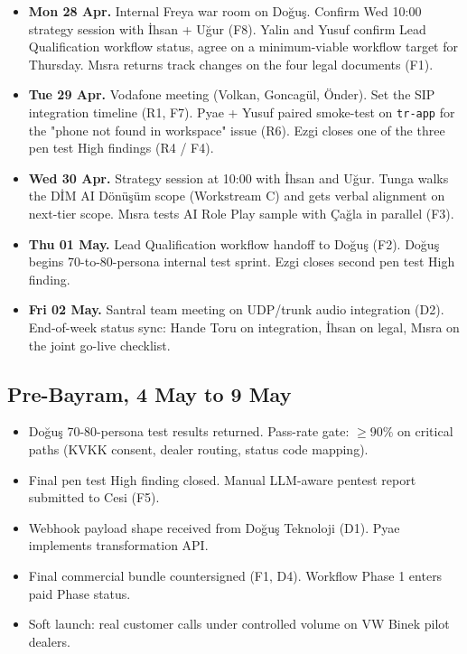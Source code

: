 \documentclass[10pt,a4paper]{article}
\begin{document}
\begin{itemize}[leftmargin=1em,itemsep=0.2em]
\item \textbf{Mon 28 Apr.} Internal Freya war room on Doğuş. Confirm Wed 10:00 strategy session with İhsan + Uğur (F8). Yalin and Yusuf confirm Lead Qualification workflow status, agree on a minimum-viable workflow target for Thursday. Mısra returns track changes on the four legal documents (F1).
\item \textbf{Tue 29 Apr.} Vodafone meeting (Volkan, Goncagül, Önder). Set the SIP integration timeline (R1, F7). Pyae + Yusuf paired smoke-test on \texttt{tr-app} for the "phone not found in workspace" issue (R6). Ezgi closes one of the three pen test High findings (R4 / F4).
\item \textbf{Wed 30 Apr.} Strategy session at 10:00 with İhsan and Uğur. Tunga walks the DİM AI Dönüşüm scope (Workstream C) and gets verbal alignment on next-tier scope. Mısra tests AI Role Play sample with Çağla in parallel (F3).
\item \textbf{Thu 01 May.} Lead Qualification workflow handoff to Doğuş (F2). Doğuş begins 70-to-80-persona internal test sprint. Ezgi closes second pen test High finding.
\item \textbf{Fri 02 May.} Santral team meeting on UDP/trunk audio integration (D2). End-of-week status sync: Hande Toru on integration, İhsan on legal, Mısra on the joint go-live checklist.
\end{itemize}

\subsection{Pre-Bayram, 4 May to 9 May}

\begin{itemize}[leftmargin=1em,itemsep=0.2em]
\item Doğuş 70-80-persona test results returned. Pass-rate gate: $\geq 90\%$ on critical paths (KVKK consent, dealer routing, status code mapping).
\item Final pen test High finding closed. Manual LLM-aware pentest report submitted to Cesi (F5).
\item Webhook payload shape received from Doğuş Teknoloji (D1). Pyae implements transformation API.
\item Final commercial bundle countersigned (F1, D4). Workflow Phase 1 enters paid Phase status.
\item Soft launch: real customer calls under controlled volume on VW Binek pilot dealers.
\end{itemize}
\end{document}
